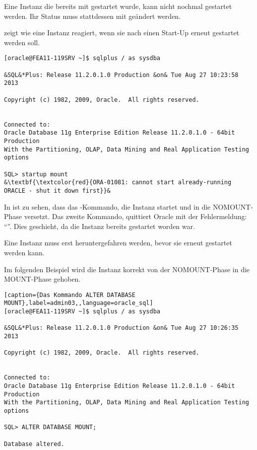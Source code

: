         \begin{merke}
          Eine Instanz die bereits mit  gestartet wurde, kann nicht nochmal gestartet werden. Ihr Status muss stattdessen mit  geändert werden.
        \end{merke}
         zeigt wie eine Instanz reagiert, wenn sie nach einen Start-Up erneut gestartet werden soll.
        \begin{lstlisting}[caption={ORACLE läuft noch. Erst
        stoppen.},label=admin02,language=sqlplus]
[oracle@FEA11-119SRV ~]$ sqlplus / as sysdba

&SQL&*Plus: Release 11.2.0.1.0 Production &on& Tue Aug 27 10:23:58 2013

Copyright (c) 1982, 2009, Oracle.  All rights reserved.


Connected to:
Oracle Database 11g Enterprise Edition Release 11.2.0.1.0 - 64bit Production
With the Partitioning, OLAP, Data Mining and Real Application Testing options

SQL> startup mount
&\textbf{\textcolor{red}{ORA-01081: cannot start already-running ORACLE - shut it down first}}&
        \end{lstlisting}
        In  ist zu sehen, dass das -Kommando, die Instanz startet und in die NOMOUNT-Phase versetzt. Das zweite Kommando,  quittiert Oracle mit der Fehlermeldung: \enquote{}. Dies geschieht, da die Instanz bereits gestartet worden war.

        \begin{merke}
          Eine Instanz muss erst heruntergefahren werden, bevor sie erneut gestartet werden kann.
        \end{merke}
\clearpage		
        Im folgenden Beispiel wird die Instanz korrekt von der NOMOUNT-Phase in die MOUNT-Phase gehoben.
        \begin{lstlisting}[caption={Das Kommando ALTER DATABASE MOUNT},label=admin03,,language=oracle_sql]
[oracle@FEA11-119SRV ~]$ sqlplus / as sysdba

&SQL&*Plus: Release 11.2.0.1.0 Production &on& Tue Aug 27 10:26:35 2013

Copyright (c) 1982, 2009, Oracle.  All rights reserved.


Connected to:
Oracle Database 11g Enterprise Edition Release 11.2.0.1.0 - 64bit Production
With the Partitioning, OLAP, Data Mining and Real Application Testing options

SQL> ALTER DATABASE MOUNT;

Database altered.
        \end{lstlisting}
